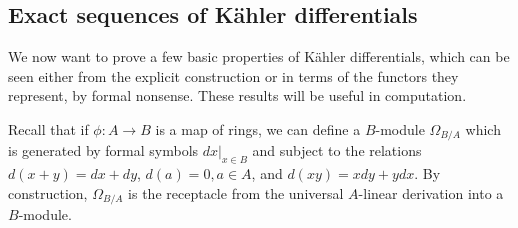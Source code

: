 \subsection{Exact sequences of K\"ahler differentials}
We now want to prove a few basic properties of K\"ahler differentials, which
can be seen either from the explicit construction or in terms of the functors
they represent, by formal nonsense.
These results will be useful in computation.

 Recall that if
$\phi: A \to B$ is a map of rings, we can define a $B$-module
\( \Omega_{B/A}\)  which is generated by formal symbols $ dx|_{x \in
B}$ and subject to the relations $d(x+y) = dx+dy$, $d(a)=0, a \in A$,
and $d(xy) = xdy + ydx$.
By construction, $\Omega_{B/A}$ is the receptacle from the universal $A$-linear
derivation into a $B$-module.

